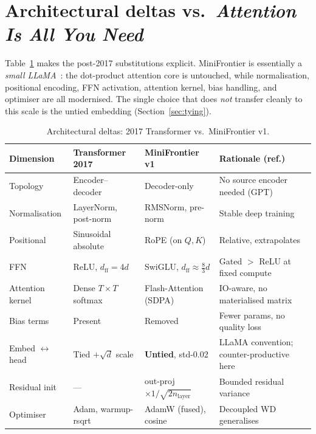 \documentclass[10pt,twocolumn]{article}
\begin{document}
\section{Architectural deltas vs.\ \emph{Attention Is All You Need}}
\label{sec:deltas}
Table~\ref{tab:deltas} makes the post-2017 substitutions explicit. MiniFrontier
is essentially a \emph{small LLaMA}~\cite{llama}: the dot-product attention core
is untouched, while normalisation, positional encoding, FFN activation, attention
kernel, bias handling, and optimiser are all modernised. The single choice that
does \emph{not} transfer cleanly to this scale is the untied embedding
(Section~\ref{sec:tying}).

\begin{table}[t]
\centering
\small
\caption{Architectural deltas: 2017 Transformer vs.\ MiniFrontier v1.}
\label{tab:deltas}
\begin{tabular}{@{}llll@{}}
\toprule
Dimension & Transformer 2017 & MiniFrontier v1 & Rationale (ref.) \\
\midrule
Topology        & Encoder--decoder            & Decoder-only                  & No source encoder needed (GPT)~\cite{gpt2} \\
Normalisation   & LayerNorm, post-norm        & RMSNorm, pre-norm             & Stable deep training~\cite{xiong2020,rmsnorm} \\
Positional      & Sinusoidal absolute         & RoPE (on $Q,K$)               & Relative, extrapolates~\cite{rope} \\
FFN             & ReLU, $d_{\text{ff}}{=}4d$  & SwiGLU, $d_{\text{ff}}{\approx}\tfrac{8}{3}d$ & Gated $>$ ReLU at fixed compute~\cite{swiglu} \\
Attention kernel& Dense $T{\times}T$ softmax  & Flash-Attention (SDPA)        & IO-aware, no materialised matrix~\cite{flash} \\
Bias terms      & Present                     & Removed                       & Fewer params, no quality loss~\cite{llama} \\
Embed $\leftrightarrow$ head & Tied $+\sqrt{d}$ scale & \textbf{Untied}, std-0.02 & LLaMA convention; counter-productive here~\cite{presswolf} \\
Residual init   & ---                         & out-proj $\times 1/\sqrt{2n_{\text{layer}}}$ & Bounded residual variance~\cite{gpt2} \\
Optimiser       & Adam, warmup-rsqrt          & AdamW (fused), cosine         & Decoupled WD generalises~\cite{adamw} \\
\bottomrule
\end{tabular}
\end{table}
\end{document}
